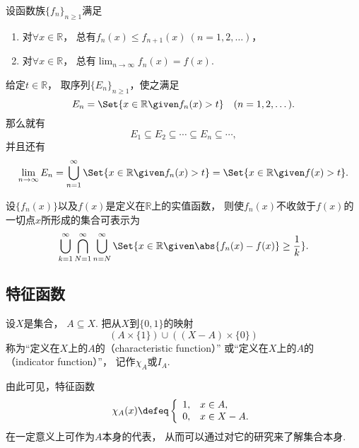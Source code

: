 \begin{example}
设函数族\(\{f_n\}_{n\geq1}\)满足
\begin{enumerate}
	\item 对\(\forall x\in\mathbb{R}\)，
	总有\(f_n(x) \leq f_{n+1}(x)\ (n=1,2,\dotsc)\)，
	\item 对\(\forall x\in\mathbb{R}\)，
	总有\(\lim_{n\to\infty} f_n(x) = f(x)\).
\end{enumerate}
给定\(t\in\mathbb{R}\)，
取序列\(\{E_n\}_{n\geq1}\)，使之满足\begin{equation*}
	E_n = \Set{ x\in\mathbb{R} \given f_n(x) > t }
	\quad(n=1,2,\dotsc).
\end{equation*}
那么就有\begin{equation*}
	E_1 \subseteq E_2 \subseteq \dotsb \subseteq E_n \subseteq \dotsb,
\end{equation*}
并且还有\begin{equation*}
	\lim_{n\to\infty} E_n
	= \bigcup_{n=1}^\infty \Set{ x\in\mathbb{R} \given f_n(x) > t }
	= \Set{ x\in\mathbb{R} \given f(x) > t }.
\end{equation*}
\end{example}

\begin{proposition}
设\(\{f_n(x)\}\)以及\(f(x)\)是定义在\(\mathbb{R}\)上的实值函数，
则使\(f_n(x)\)不收敛于\(f(x)\)的一切点\(x\)所形成的集合可表示为\begin{equation*}
	\bigcup_{k=1}^\infty
	\bigcap_{N=1}^\infty
	\bigcup_{n=N}^\infty
	\Set{
		x\in\mathbb{R}
		\given
		\abs{f_n(x) - f(x)} \geq \frac1k
	}.
\end{equation*}
\end{proposition}

\subsection{特征函数}
\begin{definition}
设\(X\)是集合，
\(A \subseteq X\).
把从\(X\)到\(\{0,1\}\)的映射\begin{equation*}
	(A \times \{1\})
	\cup
	((X - A) \times \{0\})
\end{equation*}
称为“定义在\(X\)上的\(A\)的（characteristic function）”
或“定义在\(X\)上的\(A\)的（indicator function）”，
记作\(\chi_A\)或\(I_A\).
\end{definition}
由此可见，特征函数\begin{equation*}
	\chi_A(x)
	\defeq
	\left\{ \begin{array}{cl}
		1, & x \in A, \\
		0, & x \in X - A.
	\end{array} \right.
\end{equation*}
在一定意义上可作为\(A\)本身的代表，
从而可以通过对它的研究来了解集合本身.

